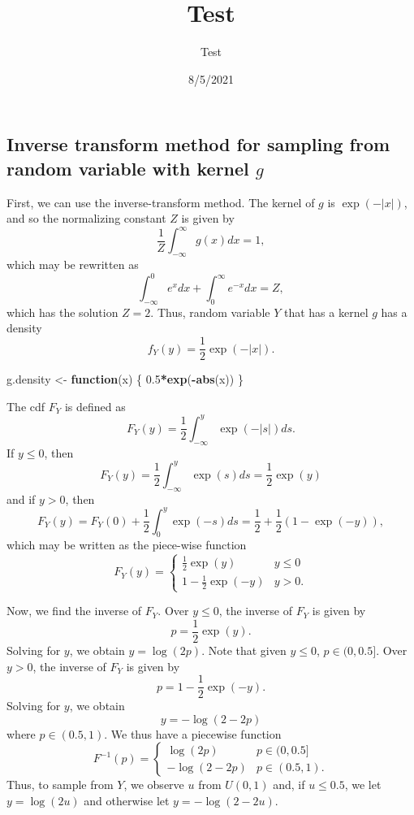 \documentclass[
]{article}
\title{Test}
\author{Test}
\date{8/5/2021}
\newenvironment{Shaded}{\begin{snugshade}}{\end{snugshade}}
\newcommand{\ControlFlowTok}[1]{\textcolor[rgb]{0.13,0.29,0.53}{\textbf{#1}}}
\newcommand{\FloatTok}[1]{\textcolor[rgb]{0.00,0.00,0.81}{#1}}
\newcommand{\FunctionTok}[1]{\textcolor[rgb]{0.13,0.29,0.53}{\textbf{#1}}}
\newcommand{\NormalTok}[1]{#1}
\newcommand{\OtherTok}[1]{\textcolor[rgb]{0.56,0.35,0.01}{#1}}
\newcommand{\SpecialCharTok}[1]{\textcolor[rgb]{0.81,0.36,0.00}{\textbf{#1}}}
\begin{document}
\maketitle

\hypertarget{inverse-transform-method-for-sampling-from-random-variable-with-kernel-g}{%
\subsection{\texorpdfstring{Inverse transform method for sampling from
random variable with kernel
\(g\)}{Inverse transform method for sampling from random variable with kernel g}}\label{inverse-transform-method-for-sampling-from-random-variable-with-kernel-g}}

First, we can use the inverse-transform method. The kernel of \(g\) is
\(\exp(-|x|)\), and so the normalizing constant \(Z\) is given by \[
  \frac{1}{Z} \int_{-\infty}^{\infty} g(x) dx = 1,
\] which may be rewritten as \[
  \int_{-\infty}^{0} e^{x} dx + \int_{0}^{\infty} e^{-x} dx = Z,
\] which has the solution \(Z=2\). Thus, random variable \(Y\) that has
a kernel \(g\) has a density \[
  f_Y(y) = \frac{1}{2} \exp(-|x|).
\]

\begin{Shaded}
\begin{Highlighting}[]
\NormalTok{g.density }\OtherTok{\textless{}{-}} \ControlFlowTok{function}\NormalTok{(x) \{ }\FloatTok{0.5}\SpecialCharTok{*}\FunctionTok{exp}\NormalTok{(}\SpecialCharTok{{-}}\FunctionTok{abs}\NormalTok{(x)) \}}
\end{Highlighting}
\end{Shaded}

The cdf \(F_Y\) is defined as \[
  F_Y(y) = \frac{1}{2}\int_{-\infty}^{y} \exp(-|s|) ds.
\] If \(y \leq 0\), then \[
  F_Y(y) = \frac{1}{2} \int_{-\infty}^{y} \exp(s) ds = \frac{1}{2}\exp(y)
\] and if \(y > 0\), then \[
  F_Y(y) = F_Y(0) + \frac{1}{2} \int_{0}^{y} \exp(-s) ds = \frac{1}{2} + \frac{1}{2}(1 - \exp(-y)),
\] which may be written as the piece-wise function \[
  F_Y(y) =
  \begin{cases}
    \frac{1}{2} \exp(y)                & y \leq 0\\
    1 - \frac{1}{2} \exp(-y) & y > 0.
  \end{cases}
\]

Now, we find the inverse of \(F_Y\). Over \(y \leq 0\), the inverse of
\(F_Y\) is given by \[
  p = \frac{1}{2} \exp(y).
\] Solving for \(y\), we obtain \(y = \log(2p)\). Note that given
\(y \leq 0\), \(p \in (0,0.5]\). Over \(y > 0\), the inverse of \(F_Y\)
is given by \[
  p = 1 - \frac{1}{2} \exp(-y).
\] Solving for \(y\), we obtain \[
  y = -\log(2-2p)
\] where \(p \in (0.5,1)\). We thus have a piecewise function \[
  F^{-1}(p) =
  \begin{cases}
    \log(2p)        & p \in (0,0.5]\\
    -\log(2-2p)     & p \in (0.5,1).
  \end{cases}
\] Thus, to sample from \(Y\), we observe \(u\) from \(U(0,1)\) and, if
\(u \leq 0.5\), we let \(y = \log(2u)\) and otherwise let
\(y = -\log(2-2u)\).
\end{document}

